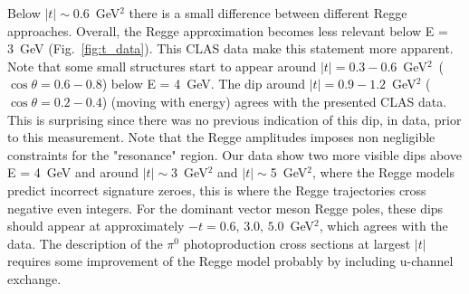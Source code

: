 \documentclass[aps,prc,twocolumn,floatfix,showpacs,preprintnumbers,amsmath,amssymb,superscriptaddress]{revtex4-1}
\begin{document}
Below $|t|\sim$0.6~GeV$^2$ there is a small difference between different Regge 
approaches.  Overall, the Regge approximation becomes less 
relevant below E = 3~GeV (Fig.~\ref{fig:t_data}).  This CLAS data 
make this statement more apparent.  Note that some small 
structures start to appear around $|t| = 
0.3-0.6$~GeV$^2$~($\cos\theta = 0.6-0.8$) below E = 4~GeV.  The dip 
around $|t| = 0.9-1.2$~GeV$^2$ ($\cos\theta = 0.2-0.4$) (moving 
with energy) agrees with the presented CLAS data.  This is surprising since
there was no previous indication of this dip, in data, prior to this measurement. Note that the Regge amplitudes imposes non negligible 
constraints for the "resonance" region.  Our data show two more 
visible dips above E = 4~GeV and around $|t|\sim$3~GeV$^2$ and 
$|t|\sim$5~GeV$^2$, where the Regge models~\cite{Goldstein,Laget,Donnachie} predict incorrect 
signature zeroes, this is where the Regge trajectories cross negative 
even integers. For the dominant vector meson Regge poles, these 
dips should appear at approximately $-t=0.6, \, 3.0, \, 
5.0$~GeV$^2$,  which agrees with the data.  
The description of the $\pi^0$ 
photoproduction cross sections at largest $|t|$ requires some
improvement of the Regge model probably by including u-channel 
exchange.
\end{document}
